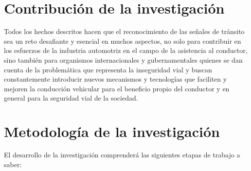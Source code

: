 \section{Contribución de la investigación}
	
	Todos los hechos descritos hacen que el reconocimiento de las señales de tránsito sea un reto desafiante y esencial en muchos aspectos, no solo para contribuir en los esfuerzos de la industria automotriz en el campo de la asistencia al conductor, sino también para organismos internacionales y gubernamentales quienes se dan cuenta de la problemática que representa la inseguridad vial y buscan constantemente introducir nuevos mecanismos y tecnologías que faciliten y mejoren la conducción vehicular para el beneficio propio del conductor y en general para la seguridad vial de la sociedad.

\newpage
\section{Metodología de la investigación}
		El desarrollo de la investigación comprenderá las siguientes etapas de trabajo a saber:

